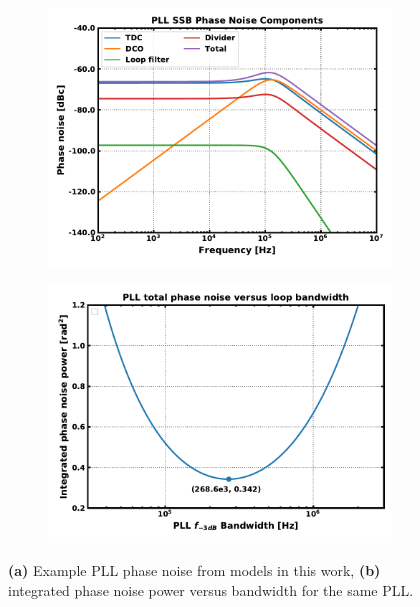 	\begin{figure}[htb!]
	    \centering
	    \begin{subfigure}{0.5\textwidth}
	        \centering
	        \includegraphics[width=1\textwidth, angle=0]{figs/pn_comps.pdf}
	        \caption{ }
	        \label{fig:ex_pll_pn_comps}
	    \end{subfigure}%
	    \begin{subfigure}{0.5\textwidth}
	        \centering
	        \includegraphics[width=1\textwidth, angle=0]{figs/bandwidth_vs_pn.pdf}
	        \caption{ }
	        \label{fig:bw_pn_tradeoff}
	    \end{subfigure}
	    \label{fig:pll_pn_examples}
	    \caption{\textbf{(a)} Example PLL phase noise from models in this work, \textbf{(b)} integrated phase noise power versus bandwidth for the same PLL.}
	\end{figure}


